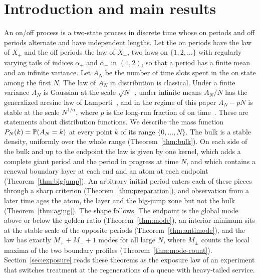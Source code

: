 \section{Introduction and main results}\label{sec:intro}

An on/off process is a two-state process in discrete time whose on periods and off periods
alternate and have independent lengths. Let the on periods have the law of $X_\plus$ and the
off periods the law of $X_\minus$, two laws on $\{1,2,\dots\}$ with regularly varying tails
of indices $\alpha_\plus$ and $\alpha_\minus$ in $(1,2)$, so that a period has a finite mean
and an infinite variance. Let $A_N$ be the number of time slots spent in the on state
among the first $N$. The law of $A_N$ in distribution is classical. Under a finite
variance $A_N$ is Gaussian at the scale $\sqrt N$~\cite{takacs1957,takacs1959,kesten1962},
under infinite means $A_N/N$ has the generalized arcsine law of
Lamperti~\cite{lamperti1958}, and in the regime of this paper $A_N-pN$ is stable at the
scale $N^{1/\alpha}$, where $p$ is the long-run fraction of on
time~\cite{takacs1957,godrecheluck2001}. These are statements about distribution
functions. We describe the mass function $P_N(k)=\mathbb{P}(A_N=k)$ at every point $k$ of its
range $\{0,\dots,N\}$. The bulk is a stable density, uniformly over the whole range
(Theorem~\ref{thm:bulk}). On each side of the bulk and up to the endpoint the law is given
by one kernel, which adds a complete giant period and the period in progress at time $N$,
and which contains a renewal boundary layer at each end and an atom at each endpoint
(Theorem~\ref{thm:bigjump}). An arbitrary initial period enters each of these pieces
through a sharp criterion (Theorem~\ref{thm:preparation}), and observation from a later
time ages the atom, the layer and the big-jump zone but not the bulk
(Theorem~\ref{thm:aging}). The shape follows. The endpoint is the global mode above or
below the golden ratio (Theorem~\ref{thm:mode}), an interior minimum sits at the stable
scale of the opposite periods (Theorem~\ref{thm:antimode}), and the law has exactly
$M_\plus+M_\minus+1$ modes for all large $N$, where $M_\pm$ counts the local maxima of the two
boundary profiles (Theorem~\ref{thm:mode-count}). Section~\ref{sec:exposure} reads these
theorems as the exposure law of an experiment that switches treatment at the regenerations
of a queue with heavy-tailed service.

